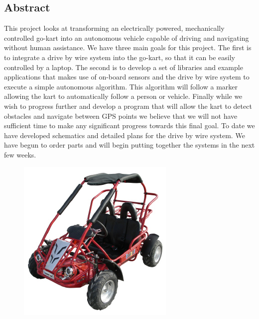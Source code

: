 \begin{center}\section*{Abstract}\end{center}
\thispagestyle{empty}

This project looks at transforming an electrically powered, mechanically controlled go-kart into an autonomous vehicle capable of driving and navigating without human assistance. We have three main goals for this project. The first is to integrate a drive by wire system into the go-kart, so that it can be easily controlled by a laptop. The second is to develop a set of libraries and example applications that makes use of on-board sensors and the drive by wire system to execute a simple autonomous algorithm. This algorithm will follow a marker allowing the kart to automatically follow a person or vehicle. Finally while we wish to progress further and develop a program that will allow the kart to detect obstacles and navigate between GPS points we believe that we will not have sufficient time to make any significant progress towards this final goal. To date we have developed schematics and detailed plans for the drive by wire system. We have begun to order parts and will begin putting together the systems in the next few weeks.

\vfill
  \begin{figure}[h]
    \centering
    \includegraphics{../../Images/hh80h.jpg}
    \label{gokart}
  \end{figure}


